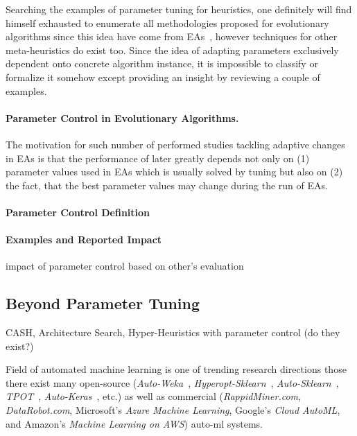 Searching the examples of parameter tuning for heuristics, one definitely will find himself exhausted to enumerate all methodologies proposed for evolutionary algorithms since this idea have come from EAs~\cite{karafotias2014parameter}, however techniques for other meta-heuristics do exist too.
Since the idea of adapting parameters exclusively dependent onto concrete algorithm instance, it is impossible to classify or formalize it somehow except providing an insight by reviewing a couple of examples.

\paragraph{Parameter Control in Evolutionary Algorithms.} The motivation for such number of performed studies tackling adaptive changes in EAs is that the performance of later greatly depends not only on (1) parameter values used in EAs which is usually solved by tuning but also on (2) the fact, that the best parameter values may change during the run of EAs. 



\paragraph{Parameter Control Definition}
\paragraph{Examples and Reported Impact}
impact of parameter control based on other's evaluation


\subsection{Beyond Parameter Tuning} 

CASH, Architecture Search, Hyper-Heuristics with parameter control (do they exist?)


Field of automated machine learning is one of trending research directions those there exist many open-source (\textit{Auto-Weka}~\cite{thornton2013auto}, \textit{Hyperopt-Sklearn}~\cite{komer2014hyperopt}, \textit{Auto-Sklearn}~\cite{feurer2015efficient}, \textit{TPOT}~\cite{olson2019tpot}, \textit{Auto-Keras}~\cite{jin2019auto}, etc.) as well as commercial (\textit{RappidMiner.com}, \textit{DataRobot.com}, Microsoft’s \textit{Azure Machine Learning}, Google’s \textit{Cloud AutoML}, and Amazon's \textit{Machine Learning on AWS}) auto-ml systems.







